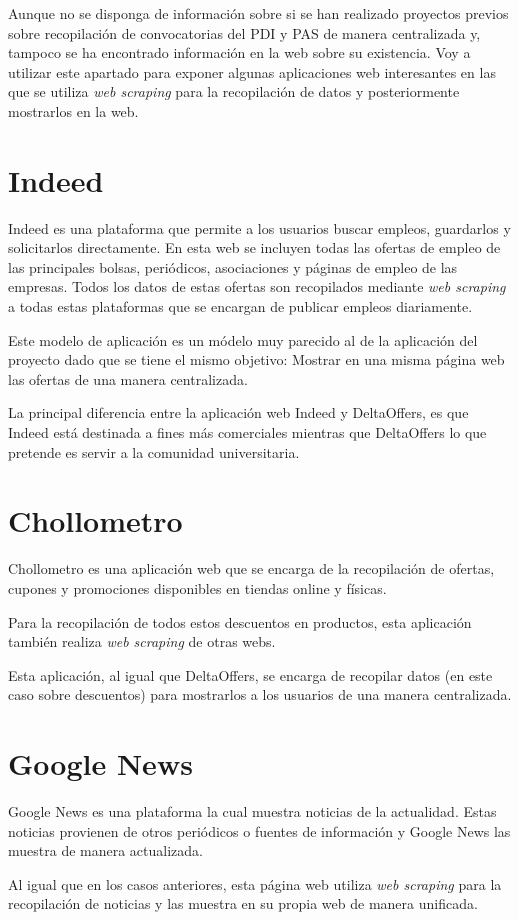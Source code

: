 
Aunque no se disponga de información sobre si se han realizado proyectos previos sobre recopilación de convocatorias del PDI y PAS de manera centralizada y, tampoco se ha encontrado información en la web sobre su existencia. Voy a utilizar este apartado para exponer algunas aplicaciones web interesantes en las que se utiliza \textit{web scraping} para la recopilación de datos y posteriormente mostrarlos en la web.

\section{Indeed}
Indeed es una plataforma que permite a los usuarios buscar empleos, guardarlos y solicitarlos directamente. En esta web se incluyen todas las ofertas de empleo de las principales bolsas, periódicos, asociaciones y páginas de empleo de las empresas. Todos los datos de estas ofertas son recopilados mediante \textit{web scraping} a todas estas plataformas que se encargan de publicar empleos diariamente.

Este modelo de aplicación es un módelo muy parecido al de la aplicación del proyecto dado que se tiene el mismo objetivo: Mostrar en una misma página web las ofertas de una manera centralizada. 

La principal diferencia entre la aplicación web Indeed y DeltaOffers, es que Indeed está destinada a fines más comerciales mientras que DeltaOffers lo que pretende es servir a la comunidad universitaria.

\section{Chollometro}
Chollometro es una aplicación web que se encarga de la recopilación de ofertas, cupones y promociones disponibles en tiendas online y físicas.

Para la recopilación de todos estos descuentos en productos, esta aplicación también realiza \textit{web scraping} de otras webs. 

Esta aplicación, al igual que DeltaOffers, se encarga de recopilar datos (en este caso sobre descuentos) para mostrarlos a los usuarios de una manera centralizada.

\section{Google News}
Google News es una plataforma la cual muestra noticias de la actualidad. Estas noticias provienen de otros periódicos o fuentes de información y Google News las muestra de manera actualizada.

Al igual que en los casos anteriores, esta página web utiliza \textit{web scraping} para la recopilación de noticias y las muestra en su propia web de manera unificada.
